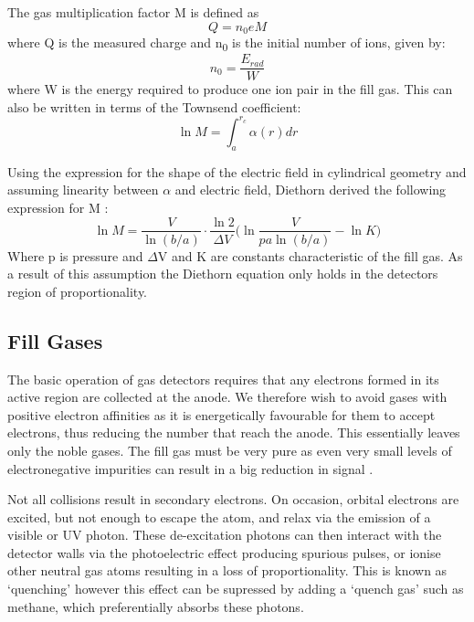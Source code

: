 The gas multiplication factor M is defined as
\begin{equation}
    Q = n_{0}eM
\end{equation}
where Q is the measured charge and n\textsubscript{0} is the initial number of ions, given by:
\begin{equation}
    n_{0} = \frac{E_{rad}}{W}
    \label{eqn: n_0}
\end{equation}
where W is the energy required to produce one ion pair in the fill gas. This can also be written in terms of the Townsend coefficient:
\begin{equation}
\ln{M} = \int_{a}^{r_{c}} \alpha(r) dr
\end{equation}

Using the expression for the shape of the electric field in cylindrical geometry and assuming linearity between $\alpha$ and electric field, Diethorn derived the following expression for M \cite{diethorn_eqn}:
\begin{equation} \label{eqn:Diethorn}
\ln{M} = \frac{V}{\ln{(b/a)}} \cdot \frac{\ln{2}}{\Delta V} \Bigg(\ln{\frac{V}{pa\ln{(b/a)}} - \ln{K}}\Bigg)
\end{equation}
Where p is pressure and $\Delta$V and K are constants characteristic of the fill gas. As a result of this assumption the Diethorn equation only holds in the detectors region of proportionality.

\subsection{Fill Gases} \label{sec:intr:fillGases}

The basic operation of gas detectors requires that any electrons formed in its active region are collected at the anode. We therefore wish to avoid gases with positive electron affinities as it is energetically favourable for them to accept electrons, thus reducing the number that reach the anode. This essentially leaves only the noble gases. The fill gas must be very pure as even very small levels of electronegative impurities can result in a big reduction in signal \cite{knoll_book}.

Not all collisions result in secondary electrons. On occasion, orbital electrons are excited, but not enough to escape the atom, and relax via the emission of a visible or UV photon. These de-excitation photons can then interact with the detector walls via the photoelectric effect producing spurious pulses, or ionise other neutral gas atoms resulting in a loss of proportionality. This is known as ‘quenching’ however this effect can be supressed by adding a ‘quench gas’ such as methane, which preferentially absorbs these photons.